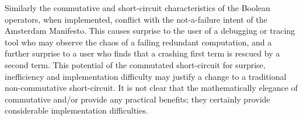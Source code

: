 \documentclass{jot}
\begin{document}





Similarly the commutative and short-circuit characteristics of the Boolean operators, when implemented, conflict with the not-a-failure intent of the Amsterdam Manifesto. This causes surprise to the user of a debugging or tracing tool who may observe the chaos of a failing redundant computation, and a further surprise to a user who finds that a crashing first term is rescued by a second term. This potential of the commutated short-circuit for surprise, inefficiency and implementation difficulty may justify a change to a traditional non-commutative short-circuit. It is not clear that the mathematically elegance of commutative and/or provide any practical benefits; they certainly provide considerable implementation difficulties.
\end{document}

